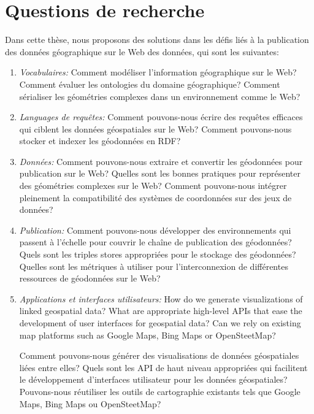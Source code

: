 \documentclass[a4paper,11pt,twoside]{report}
\begin{document}
\chapter*{Questions de recherche}

Dans cette thèse, nous proposons des solutions dans les défis liés à la publication des données géographique sur le Web des données, qui sont les suivantes: 

\begin{enumerate}

\item \textit{Vocabulaires:} Comment modéliser l'information géographique sur le Web? Comment évaluer les ontologies du domaine géographique? Comment sérialiser les géométries complexes dans un environnement comme le Web? 
\item \textit{Languages de requêtes:} Comment pouvons-nous écrire des requêtes efficaces qui ciblent les données géospatiales sur le Web? Comment pouvons-nous stocker et indexer les géodonnées en RDF?

\item \textit{Données:} Comment pouvons-nous extraire et convertir les géodonnées pour publication sur le Web? Quelles sont les bonnes pratiques pour représenter des géométries complexes sur le Web? Comment pouvons-nous intégrer pleinement la compatibilité des systèmes de coordonnées  sur des jeux de données?

\item \textit{Publication:} Comment pouvons-nous développer des environnements qui passent à l'échelle pour couvrir le chaîne de publication des géodonnées? Quels sont les triples stores appropriées pour le stockage des géodonnées? Quelles sont les métriques à utiliser pour l'interconnexion de différentes ressources de géodonnées sur le Web? 

\item \textit{Applications et interfaces utilisateurs:} How do we generate visualizations of linked geospatial data? What are appropriate high-level APIs that ease the development of user interfaces for geospatial data? Can we rely on existing map platforms such as Google Maps, Bing Maps or OpenSteetMap?

Comment pouvons-nous générer des visualisations de données géospatiales liées entre elles? Quels sont les API de haut niveau appropriées qui facilitent le développement d'interfaces utilisateur pour les données géospatiales? Pouvons-nous réutiliser les outils de cartographie existants tels que Google Maps, Bing Maps ou OpenSteetMap?

\end{enumerate}
\end{document}
